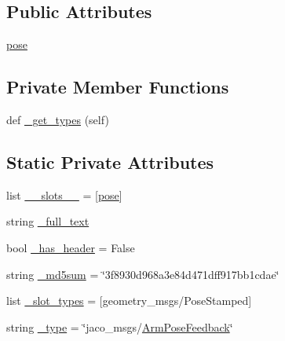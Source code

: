 \subsection*{Public Attributes}
\begin{DoxyCompactItemize}
\item 
\hyperlink{classjaco__msgs_1_1msg_1_1__ArmPoseFeedback_1_1ArmPoseFeedback_a9d4fd79ad0f686d06e0aec8f2b046b37}{pose}
\end{DoxyCompactItemize}
\subsection*{Private Member Functions}
\begin{DoxyCompactItemize}
\item 
def \hyperlink{classjaco__msgs_1_1msg_1_1__ArmPoseFeedback_1_1ArmPoseFeedback_a299cc944a1b4298e18ab6220fdf3bbb1}{\+\_\+get\+\_\+types} (self)
\end{DoxyCompactItemize}
\subsection*{Static Private Attributes}
\begin{DoxyCompactItemize}
\item 
list \hyperlink{classjaco__msgs_1_1msg_1_1__ArmPoseFeedback_1_1ArmPoseFeedback_a08b719af284f11c47e4252393c92d599}{\+\_\+\+\_\+slots\+\_\+\+\_\+} = \mbox{[}\textquotesingle{}\hyperlink{classjaco__msgs_1_1msg_1_1__ArmPoseFeedback_1_1ArmPoseFeedback_a9d4fd79ad0f686d06e0aec8f2b046b37}{pose}\textquotesingle{}\mbox{]}
\item 
string \hyperlink{classjaco__msgs_1_1msg_1_1__ArmPoseFeedback_1_1ArmPoseFeedback_a6002273d303d6844d332fd5358bc9463}{\+\_\+full\+\_\+text}
\item 
bool \hyperlink{classjaco__msgs_1_1msg_1_1__ArmPoseFeedback_1_1ArmPoseFeedback_ad72f768e0f4361806fd3fe867d0e6372}{\+\_\+has\+\_\+header} = False
\item 
string \hyperlink{classjaco__msgs_1_1msg_1_1__ArmPoseFeedback_1_1ArmPoseFeedback_a56831e0a4979e44deada98db3a578cc8}{\+\_\+md5sum} = \char`\"{}3f8930d968a3e84d471dff917bb1cdae\char`\"{}
\item 
list \hyperlink{classjaco__msgs_1_1msg_1_1__ArmPoseFeedback_1_1ArmPoseFeedback_a03c8dcb13de9e15ff8dab1ff25db7058}{\+\_\+slot\+\_\+types} = \mbox{[}\textquotesingle{}geometry\+\_\+msgs/Pose\+Stamped\textquotesingle{}\mbox{]}
\item 
string \hyperlink{classjaco__msgs_1_1msg_1_1__ArmPoseFeedback_1_1ArmPoseFeedback_a94e4d611cb6101b607c46ea879825ccb}{\+\_\+type} = \char`\"{}jaco\+\_\+msgs/\hyperlink{classjaco__msgs_1_1msg_1_1__ArmPoseFeedback_1_1ArmPoseFeedback}{Arm\+Pose\+Feedback}\char`\"{}
\end{DoxyCompactItemize}


